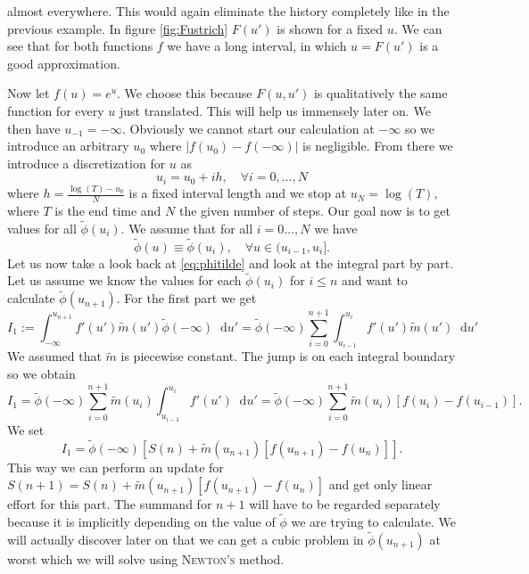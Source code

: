 \documentclass[12pt,a4paper,twoside, open=right]{scrreprt}
\theoremstyle{definition}
\theoremstyle{plain}
\newcommand{\abs}[1]{\left\vert #1\right\vert}
\newcommand{\D}{\mathop{}\!\mathrm{d}}
\begin{document}
almost everywhere. This would again eliminate the history completely like in the previous example. In figure \ref{fig:Fustrich} $F(u')$ is shown for a fixed $u$. We can see that for both functions $f$ we have a long interval, in which $u=F(u')$ is a good approximation. \par 
Now let $f(u)=e^u$. We choose this because $F(u,u')$ is qualitatively the same function for every $u$ just translated. This will help us immensely later on. We then have $u_{-1}=-\infty$. Obviously we cannot start our calculation at $-\infty$ so we introduce an arbitrary $u_0$ where $\abs{f(u_0)-f(-\infty)}$ is negligible. From there we introduce a discretization for $u$ as
\begin{equation}
    u_i = u_0+ih,\quad\forall i=0,\dotsc,N
\end{equation}
where $h = \frac{\log(T) -u_0}{N}$ is a fixed interval length and we stop at $u_N=\log(T)$, where $T$ is the end time and $N$ the given number of steps. Our goal now is to get values for all $\tilde\phi(u_i)$. We assume that for all $i=0\dotsc,N$ we have
\begin{equation}
    \tilde\phi(u) \equiv \tilde\phi(u_i), \quad\forall u\in(u_{i-1},u_i].
\end{equation}
Let us now take a look back at \eqref{eq:phitilde} and look at the integral part by part. Let us assume we know the values for each $\tilde\phi(u_i)$ for $i\le n$ and want to calculate $\tilde\phi(u_{n+1})$. For the first part we get
\begin{equation}
    I_1:=\int_{-\infty}^{u_{n+1}}f'(u')\tilde{m}(u')\tilde\phi(-\infty)\D u'=\tilde\phi(-\infty)\sum_{i=0}^{n+1}\int_{u_{i-1}}^{u_i}f'(u')\tilde{m}(u')\D u'
\end{equation}
We assumed that $\tilde{m}$ is piecewise constant. The jump is on each integral boundary so we obtain
\begin{equation}
    I_1 = \tilde{\phi}(-\infty)\sum_{i=0}^{n+1}\tilde{m}(u_i)\int_{u_{i-1}}^{u_i}f'(u')\D u' = \tilde{\phi}(-\infty)\sum_{i=0}^{n+1}\tilde{m}(u_i)[f(u_i)-f(u_{i-1})].
\end{equation}
We set 
\begin{equation}
    I_1 = \tilde\phi(-\infty)[S(n)+\tilde{m}(u_{n+1})[f(u_{n+1})-f(u_n)]].
\end{equation}
This way we can perform an update for $S(n+1) = S(n)+\tilde{m}(u_{n+1})[f(u_{n+1})-f(u_n)]$ and get only linear effort for this part. The summand for $n+1$ will have to be regarded separately because it is implicitly depending on the value of $\tilde\phi$ we are trying to calculate. We will actually discover later on that we can get a cubic problem in $\tilde\phi(u_{n+1})$ at worst which we will solve using \textsc{Newton's} method.
\end{document}
